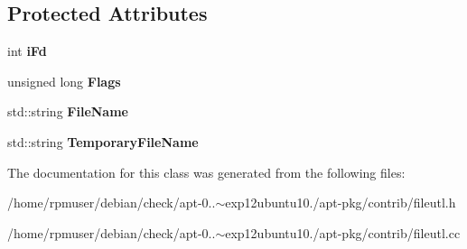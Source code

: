 \subsection*{\-Protected \-Attributes}
\begin{DoxyCompactItemize}
\item 
int {\bfseries i\-Fd}\label{classFileFd_af5d4caeb119a4aa84f6b7ff10caa9665}

\item 
unsigned long {\bfseries \-Flags}\label{classFileFd_a15eb852dd5568416ca012c6dcbff021b}

\item 
std\-::string {\bfseries \-File\-Name}\label{classFileFd_a21d40ee67459129a67fe0d8941c5b7c8}

\item 
std\-::string {\bfseries \-Temporary\-File\-Name}\label{classFileFd_a49180629bb18774fa01525c47ab60e33}

\end{DoxyCompactItemize}


\-The documentation for this class was generated from the following files\-:\begin{DoxyCompactItemize}
\item 
/home/rpmuser/debian/check/apt-\/0..$\sim$exp12ubuntu10./apt-\/pkg/contrib/fileutl.\-h\item 
/home/rpmuser/debian/check/apt-\/0..$\sim$exp12ubuntu10./apt-\/pkg/contrib/fileutl.\-cc\end{DoxyCompactItemize}
